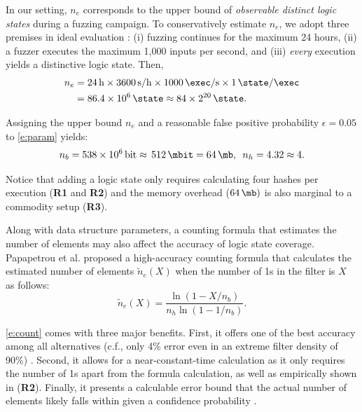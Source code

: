 \documentclass[letterpaper,twocolumn,10pt]{article}
\begin{document}
In our setting, $n_e$ corresponds to the upper bound of \emph{observable
distinct logic states} during a fuzzing campaign. To conservatively estimate
$n_e$, we adopt three premises in ideal evaluation : (i) fuzzing continues for
the maximum 24 hours, (ii) a fuzzer executes the maximum 1,000 inputs per
second, and (iii) \emph{every} execution yields a distinctive logic state. Then, 
%
\begin{align}
  n_e &= \SI{24}{\hour} \times \SI[per-mode=symbol]{3600}{\second\per\hour}
         \times \SI[per-mode=symbol]{1000}{\exec\per\second} 
         \times \SI[per-mode=symbol]{1}{\state\per\exec} \nonumber \\
      &= \SI{86.4e+6}{\state} 
         \approx \SI[parse-numbers=false]{84 \times 2^{20}}{\state}. \nonumber
\end{align}

Assigning the upper bound $n_e$ and a reasonable false positive probability
$\epsilon=0.05$ to \autoref{e:param} yields:
%
\begin{equation}
  n_b = \SI{538e+6}{\bit}\approx\,\SI{512}{\mbit}=\SI{64}{\mb}, \enspace n_h = 4.32 \approx 4. \nonumber
\end{equation}

Notice that adding a logic state only requires calculating four hashes per
execution (\textbf{R1} and \textbf{R2}) and the memory overhead ($\SI{64}{\mb})$
is also marginal to a commodity setup (\textbf{R3}). 


%
Along with data structure parameters, a counting formula that estimates the
number of elements may also affect the accuracy of logic state coverage.
Papapetrou et al. \cite{papapetrou2010cardinality} proposed a high-accuracy
counting formula that calculates the estimated number of elements
$\tilde{n}_e(X)$ when the number of 1s in the filter is $X$ as follows:
%
\begin{equation}
  \tilde{n}_e(X) = \frac{\ln{(1-X/n_b)}}{n_h \ln{(1-1/n_b)}}.
  \label{e:count}
\end{equation}

\autoref{e:count} comes with three major benefits. First, it offers one of the
best accuracy among all alternatives (c.f., only 4\% error even in an extreme
filter density of 90\%)
\cite{harmouch2017cardinality,papapetrou2010cardinality}. 
%
Second, it allows for a near-constant-time calculation as it only requires the
number of 1s apart from the formula calculation, as well as empirically shown in
\cite{harmouch2017cardinality} (\textbf{R2}). 
%
Finally, it presents a calculable error bound that the actual number of elements
likely falls within given a confidence probability \cite{papapetrou2010cardinality}.
\end{document}
